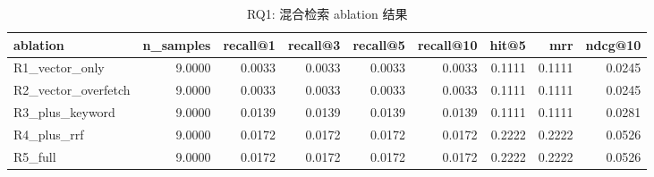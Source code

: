 \begin{table}[t]
\centering
\caption{RQ1: 混合检索 ablation 结果}
\label{tab:rq1}
\begin{tabular}{lrrrrrrrr}
\toprule
ablation & n\_samples & recall@1 & recall@3 & recall@5 & recall@10 & hit@5 & mrr & ndcg@10 \\
\midrule
R1\_vector\_only & 9.0000 & 0.0033 & 0.0033 & 0.0033 & 0.0033 & 0.1111 & 0.1111 & 0.0245 \\
R2\_vector\_overfetch & 9.0000 & 0.0033 & 0.0033 & 0.0033 & 0.0033 & 0.1111 & 0.1111 & 0.0245 \\
R3\_plus\_keyword & 9.0000 & 0.0139 & 0.0139 & 0.0139 & 0.0139 & 0.1111 & 0.1111 & 0.0281 \\
R4\_plus\_rrf & 9.0000 & 0.0172 & 0.0172 & 0.0172 & 0.0172 & 0.2222 & 0.2222 & 0.0526 \\
R5\_full & 9.0000 & 0.0172 & 0.0172 & 0.0172 & 0.0172 & 0.2222 & 0.2222 & 0.0526 \\
\bottomrule
\end{tabular}
\end{table}